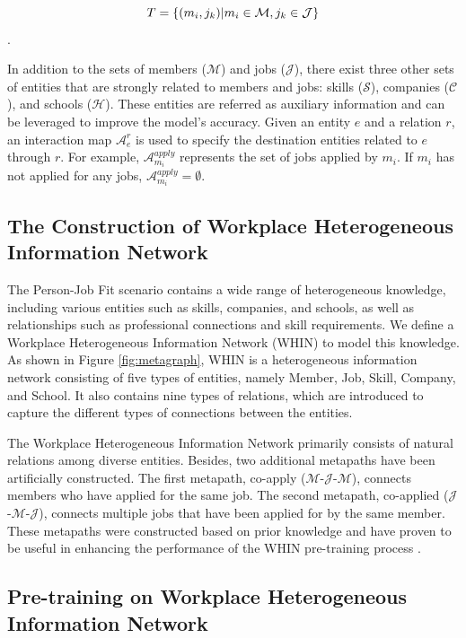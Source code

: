 $$T=\set*{(m_i, j_k)|m_i\in \mathcal{M}, j_k\in \mathcal{J}}$$.

In addition to the sets of members ($\mathcal{M}$) and jobs ($\mathcal{J}$), there exist three other sets of entities that are strongly related to members and jobs: skills ($\mathcal{S}$), companies ($\mathcal{C}$), and schools ($\mathcal{H}$). These entities are referred as auxiliary information and can be leveraged to improve the model's accuracy. Given an entity $e$ and a relation $r$, an interaction map $\mathcal{A}_{e}^{r}$ is used to specify the destination entities related to $e$ through $r$. For example, $\mathcal{A}_{m_i}^{apply}$ represents the set of jobs applied by $m_i$. If $m_i$ has not applied for any jobs, $\mathcal{A}_{m_i}^{apply}=\emptyset$.

\subsection{The Construction of Workplace Heterogeneous Information Network}
\label{The Construction of Workplace Heterogeneous Information Network}

The Person-Job Fit scenario contains a wide range of heterogeneous knowledge, including various entities such as skills, companies, and schools, as well as relationships such as professional connections and skill requirements. We define a Workplace Heterogeneous Information Network (WHIN) to model this knowledge. As shown in Figure \ref{fig:metagraph}, WHIN is a heterogeneous information network consisting of five types of entities, namely Member, Job, Skill, Company, and School. It also contains nine types of relations, which are introduced to capture the different types of connections between the entities.
 
The Workplace Heterogeneous Information Network primarily consists of natural relations among diverse entities. Besides, two additional metapaths have been artificially constructed. The first metapath, co-apply ($\mathcal{M}$-$\mathcal{J}$-$\mathcal{M}$), connects members who have applied for the same job. The second metapath, co-applied ($\mathcal{J}$-$\mathcal{M}$-$\mathcal{J}$), connects multiple jobs that have been applied for by the same member. These metapaths were constructed based on prior knowledge and have proven to be useful in enhancing the performance of the WHIN pre-training process \cite{fu2020magnn}.

\subsection{Pre-training on Workplace Heterogeneous Information Network}
\label{Pre-training on Workplace Heterogeneous Information Network}

